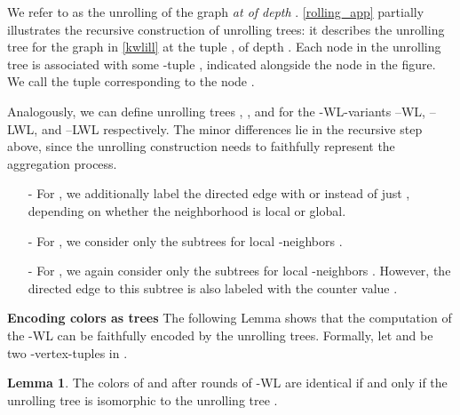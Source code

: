 \documentclass{article}
\newcommand{\xhdr}[1]{{\noindent\bfseries #1}}
\theoremstyle{definition}
\newtheorem{lemma}[theorem]{Lemma}
\newcommand{\new}[1]{\emph{#1}}
\newcommand{\kwl}{-\textsf{WL}\xspace}
\newcommand{\deltakwl}{--\textsf{WL}\xspace}
\newcommand{\localkwl}{--\textsf{LWL}\xspace}
\newcommand{\pluskwl}{--\textsf{LWL}\xspace}
\begin{document}
We refer to  as the unrolling of the graph  \new{at  of depth }. \cref{rolling_app} partially illustrates the recursive construction of unrolling trees: it describes the unrolling tree for the graph in \cref{kwlill} at the tuple , of depth . Each node  in the unrolling tree is associated with some -tuple , indicated alongside the node in the figure. We call  the tuple corresponding to the node .

Analogously, we can define unrolling trees , , and  for the \kwl-variants \deltakwl, \localkwl, and \pluskwl respectively. The minor differences lie in the recursive step above, since the unrolling construction needs to faithfully represent the aggregation process. 

\begin{itemize}
	\item[-] For , we additionally label the directed edge  with  or  instead of just , depending on whether the neighborhood is local or global. 
	\item[-] For , we consider only the subtrees  for local -neighbors . 
	\item[-] For , we again consider only the subtrees  for local -neighbors . However,
	the directed edge  to this subtree is also labeled with the  counter value .
\end{itemize}


\xhdr{Encoding colors as trees} The following Lemma shows that the computation of the \kwl can be faithfully encoded by the unrolling trees. 
Formally, let  and  be two -vertex-tuples in .

\begin{lemma}\label{encwl}
	The colors of  and  after  rounds of \kwl are identical 
	if and only if the unrolling tree  is isomorphic to the unrolling tree .  
\end{lemma}
\end{document}
